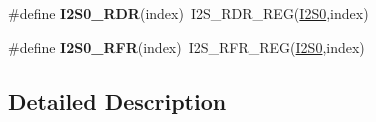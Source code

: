 \begin{DoxyCompactItemize}
\item 
\#define {\bfseries I2\+S0\+\_\+\+R\+DR}(index)~I2\+S\+\_\+\+R\+D\+R\+\_\+\+R\+EG(\hyperlink{group__I2S__Peripheral__Access__Layer_gadb0838291c90975e284e5f6a112f5877}{I2\+S0},index)\hypertarget{group__I2S__Register__Accessor__Macros_ga774947b87873cc00e394f578aa49114c}{}\label{group__I2S__Register__Accessor__Macros_ga774947b87873cc00e394f578aa49114c}

\item 
\#define {\bfseries I2\+S0\+\_\+\+R\+FR}(index)~I2\+S\+\_\+\+R\+F\+R\+\_\+\+R\+EG(\hyperlink{group__I2S__Peripheral__Access__Layer_gadb0838291c90975e284e5f6a112f5877}{I2\+S0},index)\hypertarget{group__I2S__Register__Accessor__Macros_ga16a11b7e46d71a68d47bd59f10210ea7}{}\label{group__I2S__Register__Accessor__Macros_ga16a11b7e46d71a68d47bd59f10210ea7}

\end{DoxyCompactItemize}


\subsection{Detailed Description}

